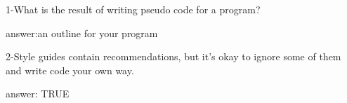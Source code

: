 1-What is the result of writing pseudo code for a program?

answer:an outline for your program

2-Style guides contain recommendations, but it's okay to ignore some of them and write code your own way.

answer: TRUE

